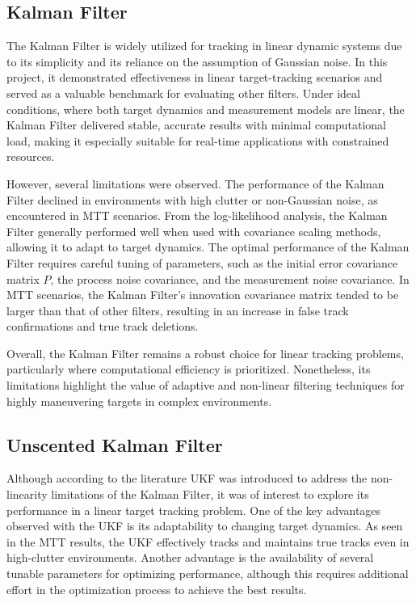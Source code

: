 \subsection{Kalman Filter}
The Kalman Filter is widely utilized for tracking in linear dynamic systems due to its simplicity and its reliance on the assumption of Gaussian noise. In this project, it demonstrated effectiveness in linear target-tracking scenarios and served as a valuable benchmark for evaluating other filters. Under ideal conditions, where both target dynamics and measurement models are linear, the Kalman Filter delivered stable, accurate results with minimal computational load, making it especially suitable for real-time applications with constrained resources.

However, several limitations were observed. The performance of the Kalman Filter declined in environments with high clutter or non-Gaussian noise, as encountered in \ac{MTT} scenarios. From the log-likelihood analysis, the Kalman Filter generally performed well when used with covariance scaling methods, allowing it to adapt to target dynamics. The optimal performance of the Kalman Filter requires careful tuning of parameters, such as the initial error covariance matrix \( P \), the process noise covariance, and the measurement noise covariance. In \ac{MTT} scenarios, the Kalman Filter’s innovation covariance matrix tended to be larger than that of other filters, resulting in an increase in false track confirmations and true track deletions.

Overall, the Kalman Filter remains a robust choice for linear tracking problems, particularly where computational efficiency is prioritized. Nonetheless, its limitations highlight the value of adaptive and non-linear filtering techniques for highly maneuvering targets in complex environments.

\subsection{Unscented Kalman Filter}
Although according to the literature \ac{UKF} was introduced to address the non-linearity limitations of the Kalman Filter, it was of interest to explore its performance in a linear target tracking problem. One of the key advantages observed with the \ac{UKF} is its adaptability to changing target dynamics. As seen in the \ac{MTT} results, the \ac{UKF} effectively tracks and maintains true tracks even in high-clutter environments. Another advantage is the availability of several tunable parameters for optimizing performance, although this requires additional effort in the optimization process to achieve the best results.

